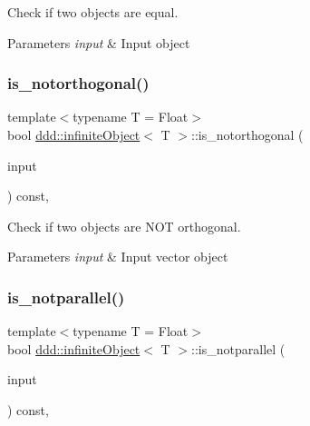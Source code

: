 Check if two objects are equal. 


\begin{DoxyParams}{Parameters}
{\em input} & Input object \\
\hline
\end{DoxyParams}
\mbox{\label{classddd_1_1infinite_object_a1dbf3e37dc6f146f089c4c63c4704329}} 
\subsubsection{\texorpdfstring{is\+\_\+notorthogonal()}{is\_notorthogonal()}}
{\footnotesize\ttfamily template$<$typename T = Float$>$ \\
bool \hyperlink{classddd_1_1infinite_object}{ddd\+::infinite\+Object}$<$ T $>$\+::is\+\_\+notorthogonal (\begin{DoxyParamCaption}\item[{const \hyperlink{classddd_1_1infinite_object}{infinite\+Object}$<$ T $>$ \&}]{input }\end{DoxyParamCaption}) const\hspace{0.3cm}{\ttfamily [inline]}, {\ttfamily [inherited]}}



Check if two objects are N\+OT orthogonal. 


\begin{DoxyParams}{Parameters}
{\em input} & Input vector object \\
\hline
\end{DoxyParams}
\mbox{\label{classddd_1_1infinite_object_ad4f312a6d767c5825632d8915a9f7dbc}} 
\subsubsection{\texorpdfstring{is\+\_\+notparallel()}{is\_notparallel()}}
{\footnotesize\ttfamily template$<$typename T = Float$>$ \\
bool \hyperlink{classddd_1_1infinite_object}{ddd\+::infinite\+Object}$<$ T $>$\+::is\+\_\+notparallel (\begin{DoxyParamCaption}\item[{const \hyperlink{classddd_1_1infinite_object}{infinite\+Object}$<$ T $>$ \&}]{input }\end{DoxyParamCaption}) const\hspace{0.3cm}{\ttfamily [inline]}, {\ttfamily [inherited]}}



